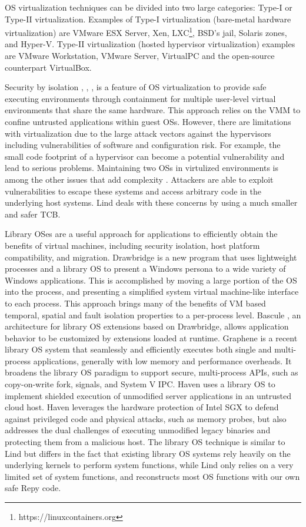 OS virtualization techniques can be divided into two large categories:  Type-I or Type-II virtualization. Examples of Type-I virtualization (bare-metal hardware virtualization) are VMware ESX Server, Xen, LXC\footnote{https://linuxcontainers.org}, BSD’s jail, Solaris zones, and Hyper-V. Type-II virtualization (hosted hypervisor virtualization) examples are VMware Workstation, VMware Server, VirtualPC and the open-source counterpart VirtualBox. 


Security by isolation \cite{Qubes}, \cite{Overshadow}, \cite{SecureVM}, \cite{HypSec} is a feature of OS virtualization to provide safe executing environments through containment for multiple user-level virtual environments that share the same hardware. This approach relies on the VMM to confine untrusted applications within guest OSs. However, there are limitations with virtualization due to the large attack vectors against the hypervisors including vulnerabilities of software and configuration risk. For example, the small code footprint of a hypervisor can become a potential vulnerability and lead to serious problems. Maintaining two OSs in virtulized environments is among the other issues that add complexity \cite{Virt-Issues}. Attackers are able to exploit vulnerabilities to escape these systems and access arbitrary code in the underlying host systems. Lind deals with these concerns by using a much smaller and safer TCB.

Library OSes are a useful approach for applications to efficiently obtain the benefits of virtual machines, 
including security isolation, host platform compatibility, and migration. Drawbridge \cite{Drawbridge-11} is a new program 
that uses lightweight processes and a library OS to present a Windows persona to a wide variety of Windows applications. 
This is accomplished by moving a large portion of the OS into the process, and presenting a simplified system 
virtual machine-like interface to each process. This approach brings many of the benefits of VM based temporal, 
spatial and fault isolation properties to a per-process level. Bascule \cite{Bascule}, an architecture for library OS extensions 
based on Drawbridge, allows application behavior to be customized by extensions loaded at runtime. 
Graphene \cite{Graphene-14} is a recent library OS system that seamlessly and efficiently executes both single and 
multi-process applications, generally with low memory and performance overheads. 
It broadens the library OS paradigm to support secure, multi-process APIs, such as copy-on-write fork, signals, 
and System V IPC. Haven \cite{Haven} uses a library OS to implement shielded execution of unmodified server applications 
in an untrusted cloud host. Haven leverages the hardware protection of Intel SGX to defend against 
privileged code and physical attacks, such as memory probes, but also addresses the dual challenges of 
executing unmodified legacy binaries and protecting them from a malicious host. 
The library OS technique is similar to Lind but differs in the fact that existing library OS systems rely heavily on 
the underlying kernels to perform system functions, while Lind only relies on a very limited set of system functions, 
and reconstructs most OS functions with our own safe Repy code. 

